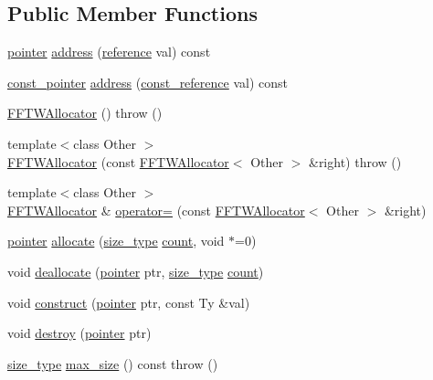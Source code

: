 \subsection*{Public Member Functions}
\begin{DoxyCompactItemize}
\item 
\hyperlink{class_f_f_t_w_allocator_ac868161c4c2d0193981575f2b9544208}{pointer} \hyperlink{class_f_f_t_w_allocator_a0f3c7381f9c1e5475ce4d835992ac770}{address} (\hyperlink{class_f_f_t_w_allocator_a54261f01b9a1fcd6608f9129f969387d}{reference} val) const 
\item 
\hyperlink{class_f_f_t_w_allocator_a71836314e7780aa80122a04ba06a2e82}{const\-\_\-pointer} \hyperlink{class_f_f_t_w_allocator_aac3ae90fb6c31820711fc73bfd146ec8}{address} (\hyperlink{class_f_f_t_w_allocator_ad6bfad7e0412d7f234b573e6cc5cf4ce}{const\-\_\-reference} val) const 
\item 
\hyperlink{class_f_f_t_w_allocator_a5caf2a306d1e917a38aec057b8222a07}{F\-F\-T\-W\-Allocator} ()  throw ()
\item 
{\footnotesize template$<$class Other $>$ }\\\hyperlink{class_f_f_t_w_allocator_acab82f75d0ad019d30e6661a18c26ff0}{F\-F\-T\-W\-Allocator} (const \hyperlink{class_f_f_t_w_allocator}{F\-F\-T\-W\-Allocator}$<$ Other $>$ \&right)  throw ()
\item 
{\footnotesize template$<$class Other $>$ }\\\hyperlink{class_f_f_t_w_allocator}{F\-F\-T\-W\-Allocator} \& \hyperlink{class_f_f_t_w_allocator_ac902aba760a3a4c56c973358002c2103}{operator=} (const \hyperlink{class_f_f_t_w_allocator}{F\-F\-T\-W\-Allocator}$<$ Other $>$ \&right)
\item 
\hyperlink{class_f_f_t_w_allocator_ac868161c4c2d0193981575f2b9544208}{pointer} \hyperlink{class_f_f_t_w_allocator_ad4eb3ac9174ea9d4318da221b42cb3da}{allocate} (\hyperlink{class_f_f_t_w_allocator_a74c8fd5a39d426623d89320b57195bdd}{size\-\_\-type} \hyperlink{qmb_8m_abf06b2196749e62f6407e77d4af49f9b}{count}, void $\ast$=0)
\item 
void \hyperlink{class_f_f_t_w_allocator_a93b03728bd23215167de93b1a203144f}{deallocate} (\hyperlink{class_f_f_t_w_allocator_ac868161c4c2d0193981575f2b9544208}{pointer} ptr, \hyperlink{class_f_f_t_w_allocator_a74c8fd5a39d426623d89320b57195bdd}{size\-\_\-type} \hyperlink{qmb_8m_abf06b2196749e62f6407e77d4af49f9b}{count})
\item 
void \hyperlink{class_f_f_t_w_allocator_a67cf726c0d58ff906b11aac72560169b}{construct} (\hyperlink{class_f_f_t_w_allocator_ac868161c4c2d0193981575f2b9544208}{pointer} ptr, const Ty \&val)
\item 
void \hyperlink{class_f_f_t_w_allocator_a5cef1aef72bcfab695539bad3deadbca}{destroy} (\hyperlink{class_f_f_t_w_allocator_ac868161c4c2d0193981575f2b9544208}{pointer} ptr)
\item 
\hyperlink{class_f_f_t_w_allocator_a74c8fd5a39d426623d89320b57195bdd}{size\-\_\-type} \hyperlink{class_f_f_t_w_allocator_ada0139132e1651347187a8d805f75401}{max\-\_\-size} () const   throw ()
\end{DoxyCompactItemize}


